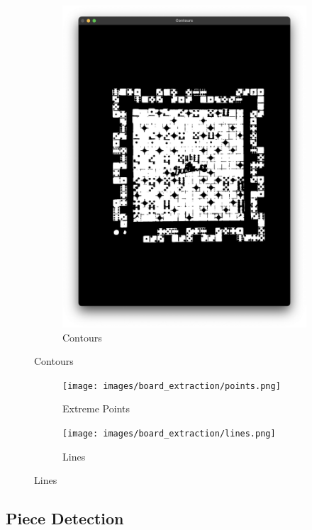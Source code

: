 \documentclass[12pt]{article}
\begin{document}
\begin{figure}[!h]
\begin{subfigure}{.5\textwidth}
            \includegraphics[width=0.9\linewidth]
            {images/board_extraction/contours.png}
            \caption{Contours}
            \label{fig:be-contours}
        \end{subfigure}
    \end{figure}
    \begin{figure}[!h]
        \ContinuedFloat
        \centering
        \begin{subfigure}{.5\textwidth}
            \centering
            \texttt{[image: images/board\_extraction/points.png]}
            \caption{Extreme Points}
            \label{fig:be-points}
        \end{subfigure}%
        \begin{subfigure}{.5\textwidth}
            \centering
            \texttt{[image: images/board\_extraction/lines.png]}
            \caption{Lines}
            \label{fig:be-lines}
        \end{subfigure}
    \end{figure}

    \subsection{Piece Detection}\label{subsec:piece-detection}
\end{document}

